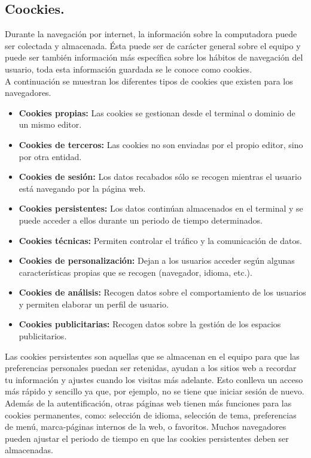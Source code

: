 \documentclass[12pt, a4paper, titlepage]{report}
\begin{document}
	    \subsection{Coockies. }
		Durante la navegación por internet, la información sobre la computadora puede ser colectada y almacenada. Ésta puede ser de carácter general sobre el equipo y puede ser también información más específica sobre los hábitos de navegación del usuario, toda esta información guardada se le conoce como \Gls{cookies}\cite{refCookies}. \\
		A continuación se muestran los diferentes tipos de cookies que existen para los navegadores.
		
		\begin{itemize}
		    \item \textbf{Cookies propias:} Las cookies se gestionan desde el terminal o dominio de un mismo editor.
		    \item \textbf{Cookies de terceros:} Las cookies no son enviadas por el propio editor, sino por otra entidad.  
		    \item \textbf{Cookies de sesión:} Los datos recabados sólo se recogen mientras el usuario está navegando por la página web.
		    \item \textbf{Cookies persistentes:} Los datos continúan almacenados en el terminal y se puede acceder a ellos durante un periodo de tiempo determinados.
		    \item \textbf{Cookies técnicas:} Permiten controlar el tráfico y la comunicación de datos.		
            \item \textbf{Cookies de personalización:} Dejan a los usuarios acceder según algunas características propias que se recogen (navegador, idioma, etc.).
            \item \textbf{Cookies de análisis:} Recogen datos sobre el comportamiento de los usuarios y permiten elaborar un perfil de usuario.
            \item \textbf{Cookies publicitarias:} Recogen datos sobre la gestión de los espacios publicitarios.
        \end{itemize}
		
		Las cookies persistentes son aquellas que se almacenan en el equipo para que las preferencias personales puedan ser retenidas, ayudan a los sitios web a recordar tu información y ajustes cuando los visitas más adelante. Esto conlleva un acceso más rápido y sencillo ya que, por ejemplo, no se tiene que iniciar sesión de nuevo. Además de la autentificación, otras páginas web tienen más funciones para las cookies permanentes, como: selección de idioma, selección de tema, preferencias de menú, marca-páginas internos de la web, o favoritos. \cite{refCookiesPersistentes}
		Muchos navegadores pueden ajustar el periodo de tiempo en que las cookies persistentes deben ser almacenadas. \\
		
\end{document}

